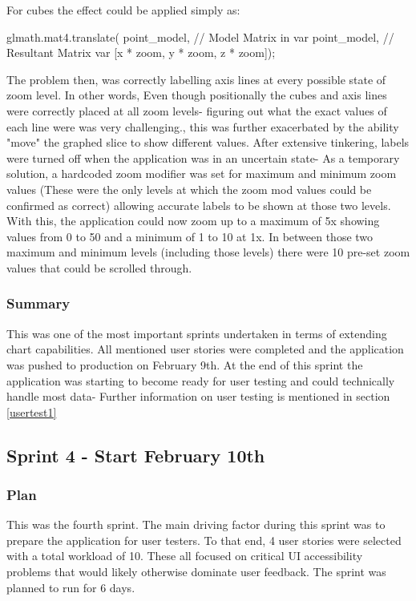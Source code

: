For cubes the effect could be applied simply as:
\begin{code}
    glmath.mat4.translate(
    point_model, // Model Matrix in var
    point_model, // Resultant Matrix var
        [x * zoom, y * zoom, z * zoom]);
\end{code}

The problem then, was correctly labelling axis lines at every possible state of zoom level. In other words, Even though positionally the cubes and axis lines were correctly placed at all zoom levels- figuring out what the exact values of each line were was very challenging., this was further exacerbated by the ability "move" the graphed slice to show different values. After extensive tinkering, labels were turned off when the application was in an uncertain state- As a temporary solution, a hardcoded zoom modifier was set for maximum and minimum zoom values (These were the only levels at which the zoom mod values could be confirmed as correct) allowing accurate labels to be shown at those two levels.
With this, the application could now zoom up to a maximum of 5x showing values from 0 to 50 and a minimum of 1 to 10 at 1x. In between those two maximum and minimum levels (including those levels) there were 10 pre-set zoom values that could be scrolled through.

\subsubsection{Summary}
This was one of the most important sprints undertaken in terms of extending chart capabilities. All mentioned user stories were completed and the application was pushed to production on February 9th. At the end of this sprint the application was starting to become ready for user testing and could technically handle most data- Further information on user testing is mentioned in section \ref{usertest1}

\subsection{Sprint 4 - Start February 10th}
\subsubsection{Plan}
This was the fourth sprint. The main driving factor during this sprint was to prepare the application for user testers. To that end, 4 user stories were selected with a total workload of 10. These all focused on critical UI accessibility problems that would likely otherwise dominate user feedback. The sprint was planned to run for 6 days.

